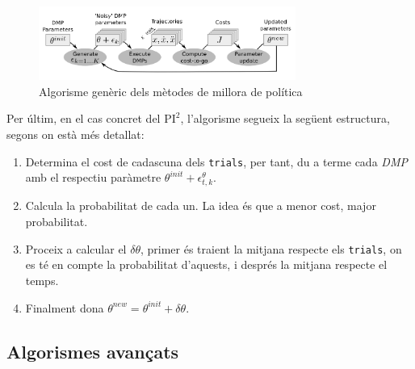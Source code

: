 \documentclass[12pt,a4paper,final,twoside]{report}
\begin{document}
\begin{figure}[tb]
\centering
\includegraphics[width=0.75\textwidth]{Imatges/policy-improvement-loop.png}
\caption{Algorisme genèric dels mètodes de millora de política \cite{Stulp2011}}
\label{fig:policy-improvement-loop}
\end{figure}

Per últim, en el cas concret del $\mathrm{PI^2}$, l'algorisme segueix la següent estructura, segons \cite{Stulp2011} on està més detallat:

\begin{enumerate}
\item Determina el cost de cadascuna dels \texttt{trials}, per tant, du a terme cada \textit{DMP} amb el respectiu paràmetre $\theta^{init} + \epsilon_{t,k}^{\theta}$.

\item Calcula la probabilitat de cada un. La idea és que a menor cost, major probabilitat.

\item Proceix a calcular el $\delta\theta$, primer és traient la mitjana respecte els \texttt{trials}, on es té en compte la probabilitat d'aquests, i després la mitjana respecte el temps.

\item Finalment dona $\theta^{new} = \theta^{init} + \delta\theta$.
\end{enumerate}

\subsection{Algorismes avançats}
\end{document}
